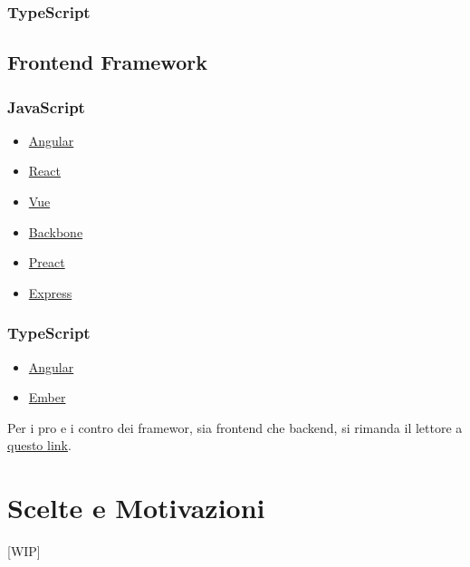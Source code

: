 \documentclass[a4paper, 12pt]{article}
\begin{document}
\subsubsection{TypeScript}

\subsection{Frontend Framework}
\subsubsection{JavaScript}
\begin{itemize}
    \item \href{https://angularjs.org/}{Angular}
    \item \href{https://react.dev/}{React}
    \item \href{https://vuejs.org/}{Vue}
    \item \href{https://backbonejs.org/}{Backbone}
    \item \href{https://preactjs.com/}{Preact}
    \item \href{https://expressjs.com/}{Express}
\end{itemize}
\subsubsection{TypeScript}
\begin{itemize}
    \item \href{https://angularjs.org/}{Angular}
    \item \href{https://emberjs.com/}{Ember}
\end{itemize}
Per i pro e i contro dei framewor, sia frontend che backend, si rimanda il lettore a \href{https://blog.geekandjob.com/framework-javascript/}{questo link}.
\newpage
\section{Scelte e Motivazioni}
[WIP]
\end{document}
